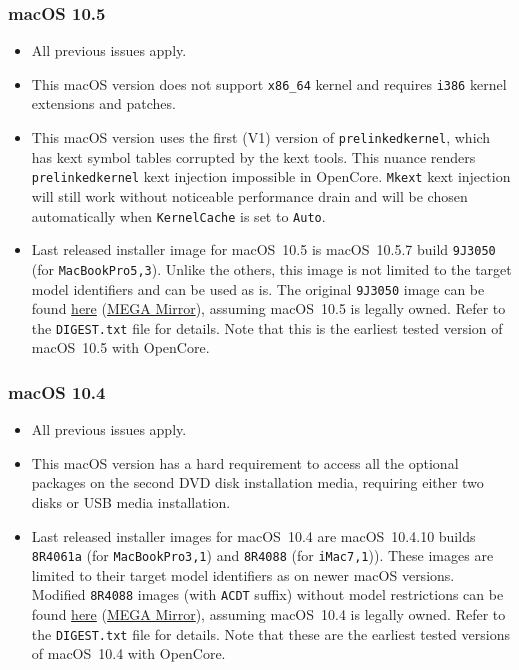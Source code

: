 \documentclass[]{article}
\begin{document}
\subsubsection{macOS 10.5}\label{legacy105}

\begin{itemize}
  \item All previous issues apply.
  \item This macOS version does not support \texttt{x86\_64} kernel
    and requires \texttt{i386} kernel extensions and patches.
  \item This macOS version uses the first (V1) version of \texttt{prelinkedkernel},
    which has kext symbol tables corrupted by the kext tools. This nuance
    renders \texttt{prelinkedkernel} kext injection impossible in OpenCore.
    \texttt{Mkext} kext injection will still work without noticeable
    performance drain and will be chosen automatically when
    \texttt{KernelCache} is set to \texttt{Auto}.
  \item Last released installer image for macOS~10.5 is macOS~10.5.7
    build \texttt{9J3050} (for \texttt{MacBookPro5,3}). Unlike the others,
    this image is not limited to the target model identifiers and can be used
    as is. The original \texttt{9J3050} image can be found
    \href{https://archive.org/details/10.5.7-9-j-3050}{here}
    (\href{https://mega.nz/folder/inRBTarD#zanf7fUbviwz3WHBU5xpCg}{MEGA Mirror}),
    assuming macOS~10.5 is legally owned. Refer to the \texttt{DIGEST.txt} file
    for details. Note that this is the earliest tested
    version of macOS~10.5 with OpenCore.
\end{itemize}

\subsubsection{macOS 10.4}\label{legacy104}

\begin{itemize}
  \item All previous issues apply.
  \item This macOS version has a hard requirement to access all the optional
    packages on the second DVD disk installation media, requiring either two
    disks or USB media installation.
  \item Last released installer images for macOS~10.4 are macOS~10.4.10
    builds \texttt{8R4061a} (for \texttt{MacBookPro3,1}) and
    \texttt{8R4088} (for \texttt{iMac7,1})). These images are limited
    to their target model identifiers as on newer macOS versions.
    Modified \texttt{8R4088} images (with \texttt{ACDT} suffix) without
    model restrictions can be found
    \href{https://archive.org/details/10.4.10-8-r-4088-acdt}{here}
    (\href{https://mega.nz/folder/D3ASzLzA\#7sjYXE2X09f6aGjol\_C7dg}{MEGA Mirror}),
    assuming macOS~10.4 is legally owned. Refer to the \texttt{DIGEST.txt} file
    for details. Note that these are the earliest tested
    versions of macOS~10.4 with OpenCore.
\end{itemize}
\end{document}
